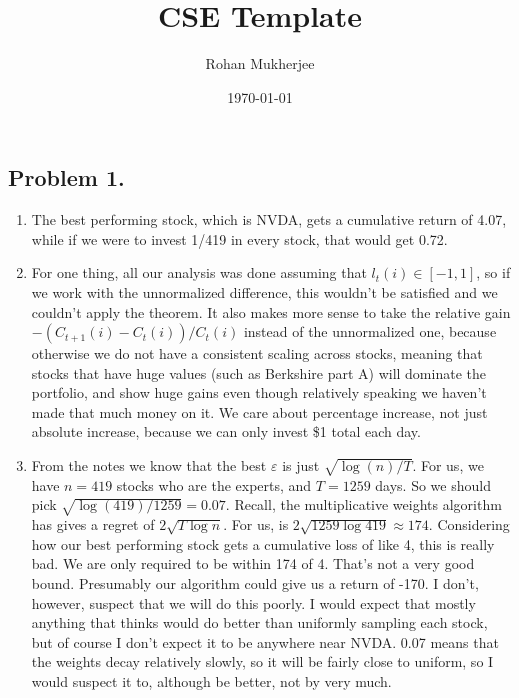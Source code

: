 \documentclass[12pt]{article}
\title{CSE Template}
\date{\today}
\author{Rohan Mukherjee}
\def\ve{\varepsilon}
\begin{document}
    \maketitle
    \subsection*{Problem 1.}
    \begin{enumerate}[label=(\alph*)]
        \item The best performing stock, which is NVDA, gets a cumulative return of 4.07, while if we were to invest 1/419 in every stock, that would get 0.72. 

        \item For one thing, all our analysis was done assuming that $l_t(i) \in [-1,1]$, so if we work with the unnormalized difference, this wouldn't be satisfied and we couldn't apply the theorem. It also makes more sense to take the relative gain $-(C_{t+1}(i) - C_t(i)) / C_t(i)$ instead of the unnormalized one, because otherwise we do not have a consistent scaling across stocks, meaning that stocks that have huge values (such as Berkshire part A) will dominate the portfolio, and show huge gains even though relatively speaking we haven't made that much money on it. We care about percentage increase, not just absolute increase, because we can only invest \$1 total each day.

        \item From the notes we know that the best $\ve$ is just $\sqrt{\log(n)/T}$. For us, we have $n = 419$ stocks who are the experts, and $T = 1259$ days. So we should pick $\sqrt{\log(419)/1259} = 0.07$. Recall, the multiplicative weights algorithm has gives a regret of $2\sqrt{T \log n}$. For us, is $2\sqrt{1259 \log 419} \approx 174$. Considering how our best performing stock gets a cumulative loss of like 4, this is really bad. We are only required to be within 174 of 4. That's not a very good bound. Presumably our algorithm could give us a return of -170. I don't, however, suspect that we will do this poorly. I would expect that mostly anything that thinks would do better than uniformly sampling each stock, but of course I don't expect it to be anywhere near NVDA. 0.07 means that the weights decay relatively slowly, so it will be fairly close to uniform, so I would suspect it to, although be better, not by very much.


\end{enumerate}
\end{document}
